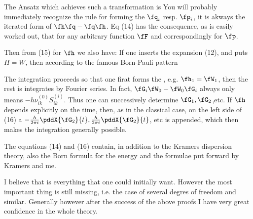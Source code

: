 The Ansatz which achieves such a transformation is
You will probably immediately recognize the rule for forming the $\fq_i$ resp. $\fp_i$, it is akways the iterated form of $\fh\fq - \fq\fh$. Eq (14) has the consequence, as is easily worked out, that for any arbitrary function $\fF$
and correspondingly for $\fp$.

Then from (15) for $\fh$ we also have:
If one inserts the expansion (12), and puts $H=W$, then according to the famous Born-Pauli pattern

The integration proceeds so that one firat forms the , e.g. $\fh_1 = \fW_1$, then the rest is integrates by Fourier series. In fact, $\fG_i\fW_0 - \fW_0\fG_i$ always only means $-h\nu_{ik}^{(0)}S_{ik}^{(i)}$. Thus one can successively determine $\fG_1,\fG_2$,etc. If $\fh$ depends explicitly on the time, then, as in the classical case, on the left side of (16) a $-\frac{h}{2\pi i}\pddX{\fG_2}{t}, \frac{h}{2\pi i} \pddX{\fG_2}{t}$, etc is appended, which then makes the integration generally possible.

The equations (14) and (16) contain, in addition to the Kramers dispersion theory, also the Born formula for the energy and the formulae put forward by Kramers and me.

I believe that is everything that one could initially want. However the most important thing is still missing, i.e. the case of several degres of freedom and similar. Generally however after the success of the above proofs I have very great confidence in the whole theory.

